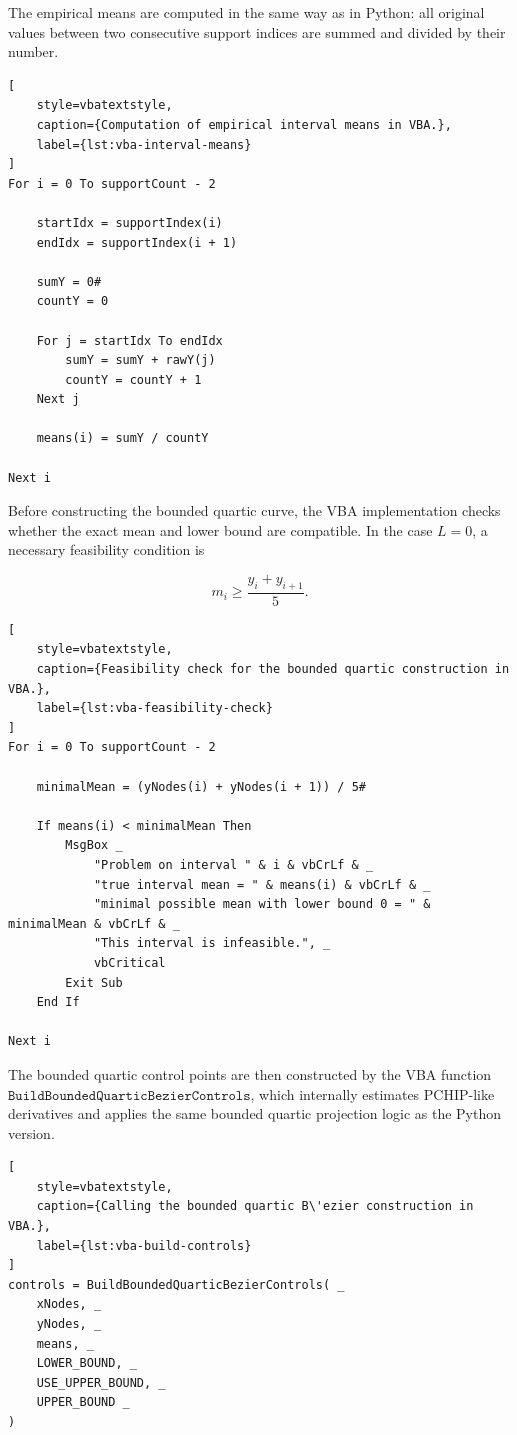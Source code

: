 \documentclass[12pt,a4paper]{article}
\begin{document}
The empirical means are computed in the same way as in Python: all original
values between two consecutive support indices are summed and divided by
their number.

\begin{lstlisting}[
    style=vbatextstyle,
    caption={Computation of empirical interval means in VBA.},
    label={lst:vba-interval-means}
]
For i = 0 To supportCount - 2

    startIdx = supportIndex(i)
    endIdx = supportIndex(i + 1)

    sumY = 0#
    countY = 0

    For j = startIdx To endIdx
        sumY = sumY + rawY(j)
        countY = countY + 1
    Next j

    means(i) = sumY / countY

Next i
\end{lstlisting}

Before constructing the bounded quartic curve, the VBA implementation checks
whether the exact mean and lower bound are compatible. In the case
\(L=0\), a necessary feasibility condition is

\[
m_i \geq \frac{y_i+y_{i+1}}{5}.
\]

\begin{lstlisting}[
    style=vbatextstyle,
    caption={Feasibility check for the bounded quartic construction in VBA.},
    label={lst:vba-feasibility-check}
]
For i = 0 To supportCount - 2

    minimalMean = (yNodes(i) + yNodes(i + 1)) / 5#

    If means(i) < minimalMean Then
        MsgBox _
            "Problem on interval " & i & vbCrLf & _
            "true interval mean = " & means(i) & vbCrLf & _
            "minimal possible mean with lower bound 0 = " & minimalMean & vbCrLf & _
            "This interval is infeasible.", _
            vbCritical
        Exit Sub
    End If

Next i
\end{lstlisting}

The bounded quartic control points are then constructed by the VBA function
\(\texttt{BuildBoundedQuarticBezierControls}\), which internally estimates
PCHIP-like derivatives and applies the same bounded quartic projection logic
as the Python version.

\begin{lstlisting}[
    style=vbatextstyle,
    caption={Calling the bounded quartic B\'ezier construction in VBA.},
    label={lst:vba-build-controls}
]
controls = BuildBoundedQuarticBezierControls( _
    xNodes, _
    yNodes, _
    means, _
    LOWER_BOUND, _
    USE_UPPER_BOUND, _
    UPPER_BOUND _
)
\end{lstlisting}
\end{document}
